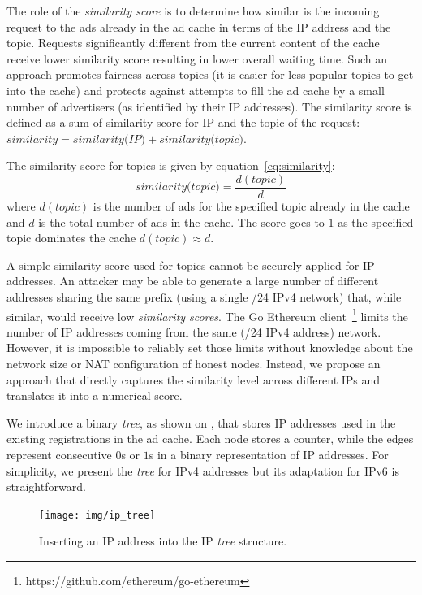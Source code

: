 The role of the \emph{similarity score} is to determine how similar is the incoming request to the ads already in the ad cache in terms of the IP address and the topic. 
Requests significantly different from the current content of the cache receive lower similarity score resulting in lower overall waiting time. 
Such an approach promotes fairness across topics (it is easier for less popular topics to get into the cache) and protects against attempts to fill the ad cache by a small number of advertisers (as identified by their IP addresses). The similarity score is defined as a sum of similarity score for IP and the topic of the request: $\textit{similarity} = \textit{similarity(IP)} + \textit{similarity(topic)}$. 

The similarity score for topics is given by equation~\ref{eq:similarity}:
\begin{equation}
\label{eq:similarity}
    \textit{similarity(topic)}= \frac{d(topic)}{d}
\end{equation}
where $d(topic)$ is the number of ads for the specified topic already in the cache and $d$ is the total number of ads in the cache. 
The score goes to $1$ as the specified topic dominates the cache $d(topic)  \approx  d$. 

A simple similarity score used for topics cannot be securely applied for IP addresses. 
An attacker may be able to generate a large number of different addresses sharing the same prefix (\eg using a single /24 IPv4 network) that, while similar, would receive low \emph{similarity scores}. 
The Go Ethereum client~\footnote{https://github.com/ethereum/go-ethereum} limits the number of IP addresses coming from the same (\eg /24 IPv4 address) network.
However, it is impossible to reliably set those limits without knowledge about the network size or NAT configuration of honest nodes. 
Instead, we propose an approach that directly captures the similarity level across different IPs and translates it into a numerical score. 

We introduce a binary \emph{tree}, as shown on , that stores IP addresses used in the existing registrations in the ad cache.
Each node stores a counter, while the edges represent consecutive $0$s or $1$s in a binary representation of IP addresses.
For simplicity,  we present the \emph{tree} for IPv4 addresses but its adaptation for IPv6 is straightforward.

\begin{figure}
    \texttt{[image: img/ip\_tree]}
    \caption{Inserting an IP address into the IP \emph{tree} structure. }
    \label{fig:ip_tree}
\end{figure}

